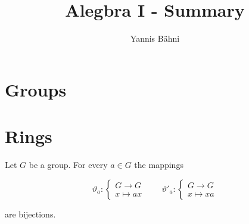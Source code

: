 


\title{Alegbra I - Summary}
\author{Yannis B\"{a}hni}
\address[Yannis B\"{a}hni]{University of Zurich, R\"{a}mistrasse 71, 8006 Zurich}

\maketitle
\thispagestyle{fancy}

\tableofcontents

\originalsectionstyle

\section{Groups}







\section{Rings}





\begin{lemma}
	Let $G$ be a group. For every $a \in G$ the mappings

	\begin{equation}
		\vartheta_a: \begin{cases}
			G \to G\\
			x \mapsto ax
		\end{cases} \qquad \vartheta'_a: \begin{cases}
			G \to G\\
			x \mapsto xa
		\end{cases}
	\end{equation}

	\noindent are bijections.
\end{lemma}

\vspace{2mm}

\begin{theorem}
	
\end{theorem}

\vspace{2mm}


